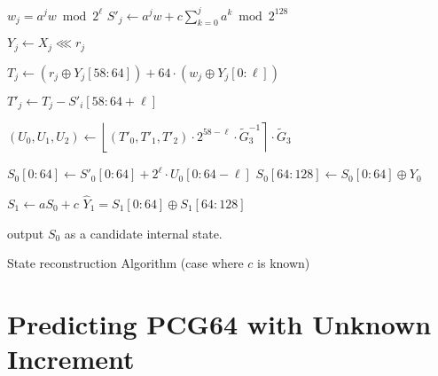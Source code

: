 \documentclass[preprint,svgnames]{iacrtrans}
\newcommand{\todo}[1]{\textcolor{red}{TODO:[#1]}}
\begin{document}
\begin{algorithm}
\begin{algorithmic}[1]
     
    \State $w_j = a^j w \bmod 2^{\ell}$ 
    \State $S'_j \gets a^j w + c \sum_{k = 0}^j a^k \bmod 2^{128}$    
    
     
    
    \State $Y_j \gets X_j \lll r_j$ 
    
    \State $ T_j \gets \left(r_j \oplus Y_j[58:64]\right) +  64 \cdot \left(w_j \oplus Y_j[0:\ell]\right)$  
    
    \State $ T'_j \gets    T_j -  S'_i[58:64+\ell]$  
    
    \State $(U_0, U_1, U_2) \gets \left\lfloor (T'_0, T'_1, T'_2) \cdot 2^{58-\ell} \cdot \widetilde G_3^{-1} \right\rceil \cdot \widetilde G_3$ 
    
    \State $ S_0[0:64] \gets  S'_0[0:64] + 2^{\ell} \cdot U_0[0:64-\ell]$ 
    \State $ S_0[64:128] \gets S_0[0:64] \oplus Y_0$ 
    
    \State $ S_1 \gets a  S_0 + c$ 
    \State $\widehat{Y}_1 =  S_1[0:64] \oplus  S_1[64:128]$
    
     
    \State output $ S_0$ as a candidate internal state.
    \EndIf
    \EndFor
    \EndFor
    \EndProcedure
  \end{algorithmic}
  \caption{State reconstruction Algorithm (case where $c$ is known)}
  \label{algo:known}
\end{algorithm}


  
\section{Predicting PCG64 with Unknown Increment}
\label{sec:Cunknown}
\end{document}
